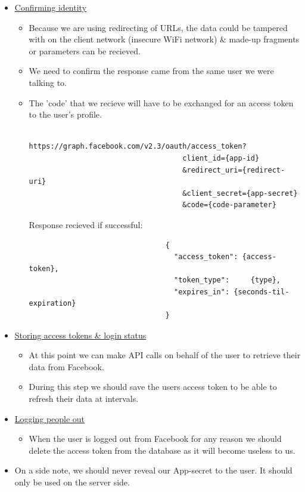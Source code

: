 \documentclass{article}
\begin{document}
\begin{itemize}
				\item \href{https://developers.facebook.com/docs/facebook-login/manually-build-a-login-flow#confirm}{Confirming identity}
					\begin{itemize}
						\item Because we are using redirecting of URLs, the data could be tampered with on the client network (insecure WiFi network) \& made-up fragments or parameters can be recieved.
						\item We need to confirm the response came from the same user we were talking to.
						\item The 'code' that we recieve will have to be exchanged for an access token to the user's profile.
							\begin{verbatim}
								https://graph.facebook.com/v2.3/oauth/access_token?
    								client_id={app-id}
   									&redirect_uri={redirect-uri}
   									&client_secret={app-secret}
   									&code={code-parameter}
							\end{verbatim}
							
						Response recieved if successful:
							\begin{verbatim}
								{
								  "access_token": {access-token}, 
								  "token_type": 	{type},
								  "expires_in":	{seconds-til-expiration}
								}
							\end{verbatim}
					\end{itemize}
				\item \href{https://developers.facebook.com/docs/facebook-login/manually-build-a-login-flow#token}{Storing access tokens \& login status}
					\begin{itemize}
						\item At this point we can make API calls on behalf of the user to retrieve their data from Facebook.
						\item During this step we should save the users access token to be able to refresh their data at intervals.
					\end{itemize}
				\item \href{https://developers.facebook.com/docs/facebook-login/manually-build-a-login-flow#logout}{Logging people out}
					\begin{itemize}
						\item When the user is logged out from Facebook for any reason we should delete the access token from the database as it will become useless to us.
					\end{itemize}
				\item On a side note, we should never reveal our App-secret to the user. It should only be used on the server side.
			\end{itemize}
\end{document}

